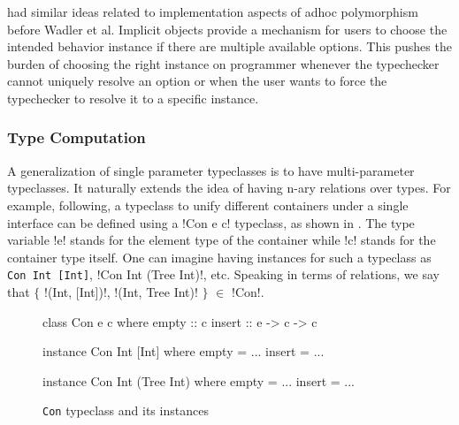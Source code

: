 \documentclass[manuscript,screen,nonacm]{acmart}
\begin{document}
\citet{kaes_parametric_1988} had similar ideas related to implementation aspects of adhoc polymorphism before Wadler et al. Implicit objects\cite{oliveira_typeclasses_2010} provide a mechanism for users to choose the intended behavior instance if there are multiple available options. This pushes the burden of choosing the right instance on programmer whenever the typechecker cannot uniquely resolve an option or when the user wants to force the typechecker to resolve it to a specific instance. %

\subsubsection{Type Computation}
A generalization of single parameter typeclasses is to have multi-parameter typeclasses. It naturally extends the idea of having n-ary relations over types. For example, following\cite{jones_tcfd_2000}, a typeclass to unify different containers under a single interface can be defined using a !Con e c! typeclass, as shown in . The type variable !e! stands for the element type of the container while !c! stands for the container type itself. One can imagine having instances for such a typeclass as \lstinline{Con Int [Int]}, !Con Int (Tree Int)!, etc. Speaking in terms of relations, we say that $\{$ !(Int, [Int])!, !(Int, Tree Int)! $\}$ $\in$ !Con!.

\begin{figure}[ht]
\centering
\begin{minipage}[ht]{0.3\linewidth}
\begin{code}
class Con e c where
  empty :: c
  insert :: e -> c -> c
\end{code}
\end{minipage}%
\begin{minipage}[ht]{0.3\linewidth}
\begin{code}
instance Con Int [Int] where
  empty = ...
  insert = ...
\end{code}
\end{minipage}%
\begin{minipage}[ht]{0.3\linewidth}
\begin{code}
instance Con Int (Tree Int) where
  empty = ...
  insert = ...
\end{code}
\end{minipage}
\caption[\lstinline{Con} typeclass]{\lstinline{Con} typeclass and its instances}
\label{fig:tc-collection}
\end{figure}
\end{document}
